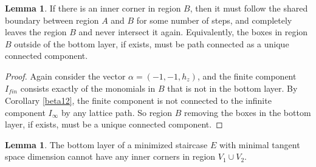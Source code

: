 \documentclass{amsart}[10pt]
\theoremstyle{plain}
\theoremstyle{definition}
\newtheorem{lemma}[theorem]{Lemma}
\begin{document}
\begin{lemma}
\label{Bcompconnected}
If there is an inner corner in region $B$, then it must follow the shared boundary between region $A$ and $B$ for some number of steps, and completely leaves the region $B$ and never intersect it again. Equivalently, the boxes in region $B$ outside of the bottom layer, if exists, must be path connected as a unique connected component.   
\end{lemma}

\begin{proof}
Again consider the vector $\alpha=(-1, -1, h_z)$, and the finite component $I_{\textit{fin}}$ consists exactly of the monomials in $B$ that is not in the bottom layer. By Corollary \ref{beta12}, the finite component is not connected to the infinite component $I_\infty$ by any lattice path. So region $B$ removing the boxes in the bottom layer, if exists, must be a unique connected component. 
\end{proof}

\begin{lemma}
\label{nocornerinV}
The bottom layer of a minimized staircase $E$ with minimal tangent space dimension cannot have any inner corners in region $V_1 \cup V_2$.
\end{lemma}
\end{document}
